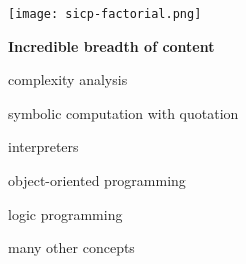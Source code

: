 \begin{frame}
\centering
\texttt{[image: sicp-factorial.png]}
\end{frame}


\begin{frame}

\begin{center}
{\bf Incredible breadth of content}
\end{center}
\begin{center} complexity analysis \end{center}
\begin{center} symbolic computation with quotation \end{center}
\begin{center} interpreters \end{center}
\begin{center} object-oriented programming \end{center}
\begin{center} logic programming \end{center}
\begin{center} many other concepts \end{center}
\end{frame}

